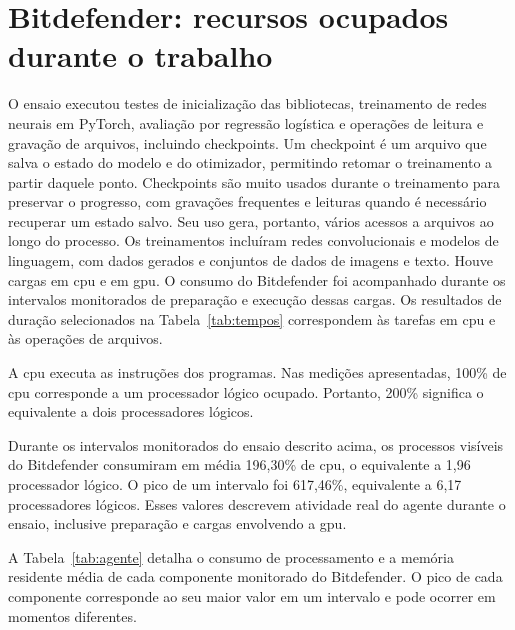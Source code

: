 \documentclass[11pt,a4paper]{article}
\begin{document}
\section{Bitdefender: recursos ocupados durante o trabalho}
O ensaio executou testes de inicialização das bibliotecas, treinamento de redes neurais em PyTorch, avaliação por regressão logística e operações de leitura e gravação de arquivos, incluindo checkpoints. Um checkpoint é um arquivo que salva o estado do modelo e do otimizador, permitindo retomar o treinamento a partir daquele ponto. Checkpoints são muito usados durante o treinamento para preservar o progresso, com gravações frequentes e leituras quando é necessário recuperar um estado salvo. Seu uso gera, portanto, vários acessos a arquivos ao longo do processo. Os treinamentos incluíram redes convolucionais e modelos de linguagem, com dados gerados e conjuntos de dados de imagens e texto. Houve cargas em \ac{cpu} e em \ac{gpu}. O consumo do Bitdefender foi acompanhado durante os intervalos monitorados de preparação e execução dessas cargas. Os resultados de duração selecionados na Tabela~\ref{tab:tempos} correspondem às tarefas em \ac{cpu} e às operações de arquivos.

A \ac{cpu} executa as instruções dos programas. Nas medições apresentadas, 100\% de \ac{cpu} corresponde a um processador lógico ocupado. Portanto, 200\% significa o equivalente a dois processadores lógicos.

Durante os intervalos monitorados do ensaio descrito acima, os processos visíveis do Bitdefender consumiram em média 196,30\% de \ac{cpu}, o equivalente a 1,96 processador lógico. O pico de um intervalo foi 617,46\%, equivalente a 6,17 processadores lógicos. Esses valores descrevem atividade real do agente durante o ensaio, inclusive preparação e cargas envolvendo a \ac{gpu}.

A Tabela~\ref{tab:agente} detalha o consumo de processamento e a memória residente média de cada componente monitorado do Bitdefender. O pico de cada componente corresponde ao seu maior valor em um intervalo e pode ocorrer em momentos diferentes.
\end{document}
